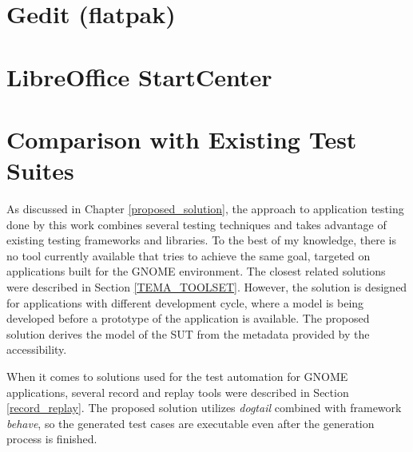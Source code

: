 \section{Gedit (flatpak)}
\section{LibreOffice StartCenter}
\section{Comparison with Existing Test Suites}
As discussed in Chapter \ref{proposed_solution}, the approach to application testing done by this work combines several testing techniques and takes advantage of existing testing frameworks and libraries. To the best of my knowledge, there is no tool currently available that tries to achieve the same goal, targeted on applications built for the GNOME environment. The closest related solutions were described in Section \ref{TEMA_TOOLSET}. However, the solution is designed for applications with different development cycle, where a model is being developed before a prototype of the application is available. The proposed solution derives the model of the SUT from the metadata provided by the accessibility.

When it comes to solutions used for the test automation for GNOME applications, several record and replay tools were described in Section \ref{record_replay}. The proposed solution utilizes \textit{dogtail} combined with framework \textit{behave}, so the generated test cases are executable even after the generation process is finished.

